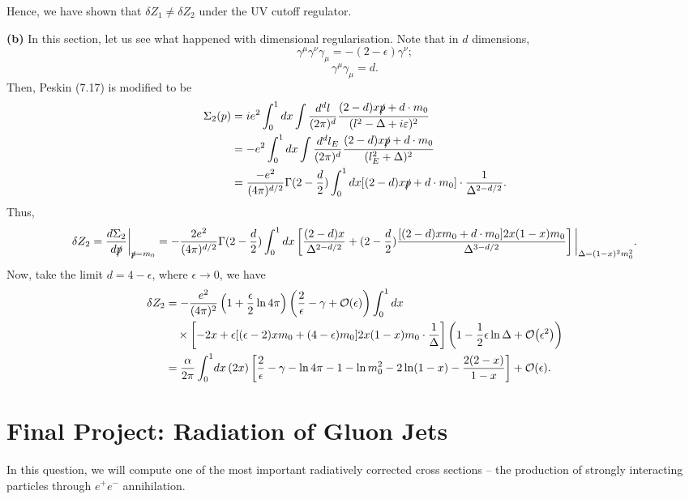 \documentclass[11pt]{article}
\theoremstyle{definition}
\begin{document}
Hence, we have shown that $\delta Z_1 \neq \delta Z_2$ under the UV cutoff regulator.

\textbf{(b)}
In this section, let us see what happened with dimensional regularisation. Note that in $d$ dimensions,
\begin{equation}
    \gamma^\mu\gamma^\nu\gamma_\mu = -(2-\epsilon)\gamma^\nu;
\end{equation}
\begin{equation}
    \gamma^\mu \gamma_\mu = d.
\end{equation}
Then, Peskin (7.17) is modified to be
\begin{equation}
\begin{aligned}
        \Sigma_2(p) &= ie^2\int^1_0dx\int\frac{d^dl}{(2\pi)^d}\frac{(2-d)x\slashed{p}+d\cdot m_0}{(l^2-\Delta+i\varepsilon)^2}\\
        &=-e^2\int^1_0dx\int\frac{d^dl_E}{(2\pi)^d}\frac{(2-d)x\slashed{p}+d\cdot m_0}{(l_E^2+\Delta)^2}\\
        &= \frac{-e^2}{(4\pi)^{d/2}}\Gamma(2-\frac{d}{2})\int^1_0dx[(2-d)x\slashed{p}+d\cdot m_0]\cdot\frac{1}{\Delta^{2-d/2}}.
\end{aligned}
\end{equation}
Thus,
\begin{equation}
    \delta Z_2 = \frac{d\Sigma_2}{d\slashed{p}}\bigg|_{\slashed{p}=m_0}=-\frac{2e^2}{(4\pi)^{d/2}}\Gamma(2-\frac{d}{2})\int^1_0dx\left[\frac{(2-d)x}{\Delta^{2-d/2}} + (2-\frac{d}{2})\frac{[(2-d)xm_0+d\cdot m_0]2x(1-x)m_0}{\Delta^{3-d/2}}\right]\bigg|_{\Delta=(1-x)^2m_0^2}.
\end{equation}
Now, take the limit $d=4-\epsilon$, where $\epsilon\to0$, we have
\begin{equation}
\begin{aligned}
    \delta Z_2 &= -\frac{e^2}{(4\pi)^{2}}\left(1+\frac{\epsilon}{2}\ln4\pi\right)\left(\frac{2}{\epsilon}-\gamma+\order{\epsilon} \right)\int^1_0dx
    \\
    &\quad \times\left[-2x+\epsilon[(\epsilon-2)xm_0+(4-\epsilon)m_0]2x(1-x)m_0\cdot\frac{1}{\Delta}\right]\left(1-\frac{1}{2}\epsilon\ln\Delta+\order{\epsilon^2}\right)\\
    &=\frac{\alpha}{2\pi}
\int_0^1\!dx\, (2x)
\left[
\frac{2}{\epsilon}
-\gamma
-\ln 4\pi
-1
-\ln m_0^2
-2\ln(1-x)
-\frac{2(2-x)}{1-x}
\right]
+\mathcal{O}(\epsilon).
\end{aligned}
\end{equation}


\section{Final Project: Radiation of Gluon Jets}
In this question, we will compute one of the most important radiatively corrected cross sections – the production of strongly interacting particles through $e^+e^-$ annihilation. 
\end{document}
